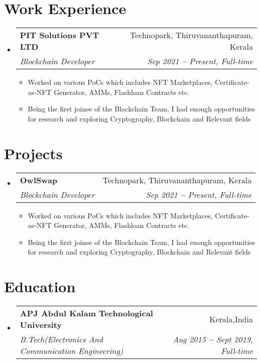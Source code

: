 \documentclass[letterpaper,11pt]{article}
\makeatletter
\newcommand{\resumeItem}[1]{
  \item\small{
    {#1 \vspace{-2pt}}
  }
}
\newcommand{\resumeSubheading}[4]{
  \vspace{-2pt}\item
    \begin{tabular*}{0.97\textwidth}[t]{l@{\extracolsep{\fill}}r}
      \textbf{#1} & #2 \\
      \textit{\small#3} & \textit{\small #4} \\
    \end{tabular*}\vspace{-7pt}
}
\newcommand{\resumeSubHeadingListStart}{\begin{itemize}[leftmargin=0.15in, label={}]}
\newcommand{\resumeSubHeadingListEnd}{\end{itemize}}
\newcommand{\resumeItemListStart}{\begin{itemize}}
\newcommand{\resumeItemListEnd}{\end{itemize}\vspace{-5pt}}
\makeatother
\begin{document}

\section{Work Experience}
  \vspace{3pt}
  \resumeSubHeadingListStart

    \resumeSubheading
      {PIT Solutions PVT LTD}{Technopark, Thiruvananthapuram, Kerala}
      {Blockchain Developer}{Sep 2021 \textbf{--} Present, Full-time}
        \resumeItemListStart
            \resumeItem{Worked on various PoCs which includes NFT Marketplaces, Certificate-as-NFT Generator, AMMs, Flashloan Contracts etc.}
            \resumeItem{Being the first joinee of the Blockchain Team, I had enough opportunities for research and exploring Cryptography, Blockchain and Relevant fields}
        \resumeItemListEnd
    
  \resumeSubHeadingListEnd

  



\section{Projects}
  \vspace{3pt}
  \resumeSubHeadingListStart

    \resumeSubheading
      {OwlSwap}{Technopark, Thiruvananthapuram, Kerala}
      {Blockchain Developer}{Sep 2021 \textbf{--} Present, Full-time}
        \resumeItemListStart
            \resumeItem{Worked on various PoCs which includes NFT Marketplaces, Certificate-as-NFT Generator, AMMs, Flashloan Contracts etc.}
            \resumeItem{Being the first joinee of the Blockchain Team, I had enough opportunities for research and exploring Cryptography, Blockchain and Relevant fields}
        \resumeItemListEnd
    
  \resumeSubHeadingListEnd


\section{Education}
  \vspace{3pt}
  \resumeSubHeadingListStart

    \resumeSubheading
      { APJ Abdul Kalam Technological University}{Kerala,India}
      {B.Tech(Electronics And Communication Engineering)}{Aug 2015 \textbf{--} Sept 2019, Full-time}
  
      \resumeSubHeadingListEnd
\end{document}
